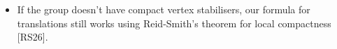 \documentclass[preview]{standalone}
\begin{document}
\begin{center}
\begin{itemize} \item If the group doesn't have compact vertex stabilisers, our formula for translations still works using Reid-Smith's theorem for local compactness [RS26].\end{itemize}
\end{center}
\end{document}
